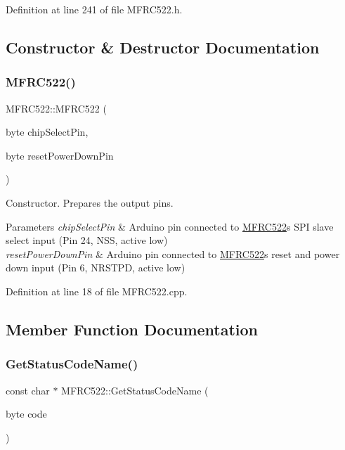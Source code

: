 Definition at line 241 of file M\+F\+R\+C522.\+h.



\subsection{Constructor \& Destructor Documentation}
\mbox{\label{class_m_f_r_c522_a8b859e244e80970594bf333a0148ade1}} 
\subsubsection{\texorpdfstring{M\+F\+R\+C522()}{MFRC522()}}
{\footnotesize\ttfamily M\+F\+R\+C522\+::\+M\+F\+R\+C522 (\begin{DoxyParamCaption}\item[{byte}]{chip\+Select\+Pin,  }\item[{byte}]{reset\+Power\+Down\+Pin }\end{DoxyParamCaption})}

Constructor. Prepares the output pins. 
\begin{DoxyParams}{Parameters}
{\em chip\+Select\+Pin} & Arduino pin connected to \hyperlink{class_m_f_r_c522}{M\+F\+R\+C522}\textquotesingle{}s S\+PI slave select input (Pin 24, N\+SS, active low) \\
\hline
{\em reset\+Power\+Down\+Pin} & Arduino pin connected to \hyperlink{class_m_f_r_c522}{M\+F\+R\+C522}\textquotesingle{}s reset and power down input (Pin 6, N\+R\+S\+T\+PD, active low) \\
\hline
\end{DoxyParams}


Definition at line 18 of file M\+F\+R\+C522.\+cpp.



\subsection{Member Function Documentation}
\mbox{\label{class_m_f_r_c522_a63e898d6efcce838b17778403f7003a9}} 
\subsubsection{\texorpdfstring{Get\+Status\+Code\+Name()}{GetStatusCodeName()}}
{\footnotesize\ttfamily const char $\ast$ M\+F\+R\+C522\+::\+Get\+Status\+Code\+Name (\begin{DoxyParamCaption}\item[{byte}]{code }\end{DoxyParamCaption})}


